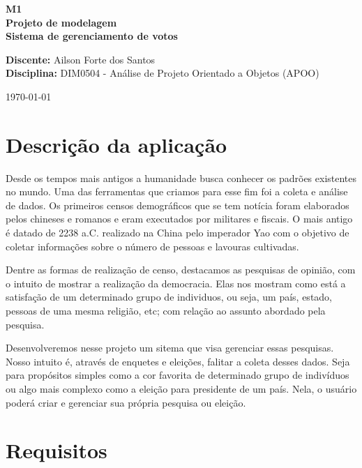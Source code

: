 \documentclass[a4paper,12pt]{article}
\begin{document}
\begin{titlepage}
\begin{center}
\centering
\linespread{2.0}
\Huge\Huge\textbf{M1} \\
\huge\huge\textbf{Projeto de modelagem} \\
\LARGE\LARGE\textbf{Sistema de gerenciamento de votos} \\
\vfill
\end{center}
\textbf{Discente: } Ailson Forte dos Santos \\
\textbf{Disciplina: } DIM0504 - Análise de Projeto Orientado a Objetos (APOO) \\
{\par\hfill\today}
\end{titlepage}
\newpage
\tableofcontents

\newpage
\section*{Descrição da aplicação}
\markright{}
Desde os tempos mais antigos a humanidade busca conhecer os padrões existentes no mundo. Uma das ferramentas que criamos para esse fim foi a coleta e análise de dados. Os primeiros censos demográficos que se tem notícia foram elaborados pelos chineses e romanos e eram executados por militares e fiscais. O mais antigo é datado de 2238 a.C. realizado na China pelo imperador Yao com o objetivo de coletar informações sobre o número de pessoas e lavouras cultivadas.
\par Dentre as formas de realização de censo, destacamos as pesquisas de opinião, com o intuito de mostrar a realização da democracia. Elas nos mostram como está a satisfação de um determinado grupo de individuos, ou seja, um país, estado, pessoas de uma mesma religião, etc; com relação ao assunto abordado pela pesquisa.
\par Desenvolveremos nesse projeto um sitema que visa gerenciar essas pesquisas. Nosso intuito é, através de enquetes e eleições, falitar a coleta desses dados. Seja para propósitos simples como a cor favorita de determinado grupo de indivíduos ou algo mais complexo como a eleição para presidente de um país. Nela, o usuário poderá criar e gerenciar sua própria pesquisa ou eleição.

\newpage
\section*{Requisitos}
\markright{}
\end{document}
